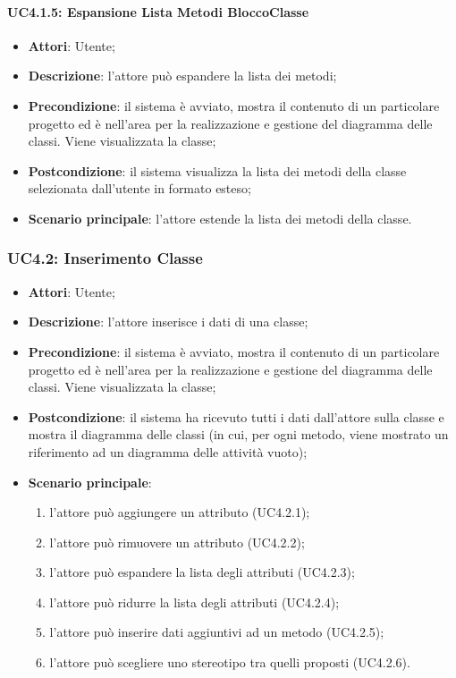 \paragraph{UC4.1.5: Espansione Lista Metodi BloccoClasse}
\label{UC4.1.5}
\begin{itemize}
	\item \textbf{Attori}: Utente;
	\item \textbf{Descrizione}: l'attore può espandere la lista dei metodi;
	\item \textbf{Precondizione}: il sistema è avviato, mostra il contenuto di un particolare progetto ed è nell'area per la realizzazione e gestione del diagramma delle classi. Viene visualizzata la classe;
	\item \textbf{Postcondizione}: il sistema visualizza la lista dei metodi della classe selezionata dall'utente in formato esteso;
	\item \textbf{Scenario principale}: l'attore estende la lista dei metodi della classe.
\end{itemize}

\subsubsection{UC4.2: Inserimento Classe}
\label{UC4.2}
\begin{itemize}
	\item \textbf{Attori}: Utente;
	\item \textbf{Descrizione}: l'attore inserisce i dati di una classe;
	\item \textbf{Precondizione}: il sistema è avviato, mostra il contenuto di un particolare progetto ed è nell'area per la realizzazione e gestione del diagramma delle classi. Viene visualizzata la classe;
	\item \textbf{Postcondizione}: il sistema ha ricevuto tutti i dati dall'attore sulla classe e mostra il diagramma delle classi (in cui, per ogni metodo, viene mostrato un riferimento ad un diagramma delle attività vuoto);
	\item \textbf{Scenario principale}:
	\begin{enumerate}
		\item l'attore può aggiungere un attributo (UC4.2.1);
		\item l'attore può rimuovere un attributo (UC4.2.2);
		\item l'attore può espandere la lista degli attributi (UC4.2.3);
		\item l'attore può ridurre la lista degli attributi (UC4.2.4);
		\item l'attore può inserire dati aggiuntivi ad un metodo (UC4.2.5);
		\item l'attore può scegliere uno stereotipo tra quelli proposti (UC4.2.6).%
	\end{enumerate}
\end{itemize}

